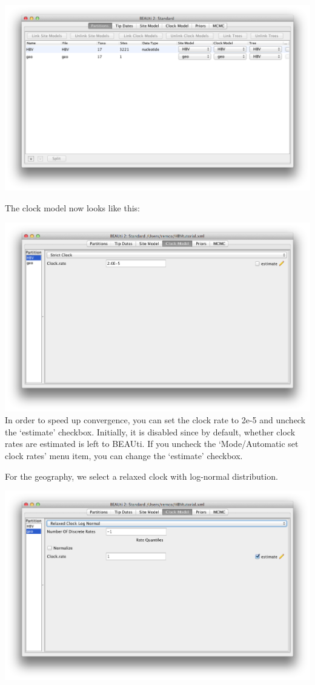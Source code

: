 \documentclass{article}
\begin{document}
\includegraphics[scale=0.4]{figures/BEAUti_DataPartitions2.png}

The clock model now looks like this:

\includegraphics[scale=0.4,clip=true,trim=0 300 0 0]{figures/BEAUti_clockmodel2.png}
In order to speed up convergence, you can set the clock rate to 2e-5 and uncheck the `estimate' checkbox. Initially, it is disabled since by default, whether clock rates are estimated is left to BEAUti. If you uncheck the `Mode/Automatic set clock rates' menu item, you can change the `estimate' checkbox.

For the geography, we select a relaxed clock with log-normal distribution. 

\includegraphics[scale=0.4,clip=true,trim=0 300 0 0]{figures/BEAUti_clockmodel3.png}
\end{document}
